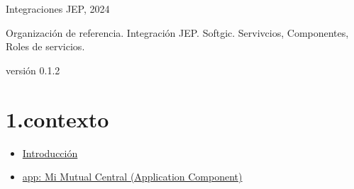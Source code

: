 \documentclass[
  paper=a4,
  ,captions=tableheading
]{scrartcl}
\providecommand{\tightlist}{%
  \setlength{\itemsep}{0pt}\setlength{\parskip}{0pt}}
\begin{document}



Integraciones JEP, 2024

Organización de referencia. Integración JEP. Softgic. Servivcios,
Componentes, Roles de servicios.

versión 0.1.2

\hypertarget{contexto}{%
\section{1.contexto}\label{contexto}}

\begin{itemize}
\tightlist
\item
  \protect\hyperlink{Introducciuxf3n}{Introducción}
\item
  \protect\hyperlink{app:-mi-mutual-central-application-component}{app:
  Mi Mutual Central (Application Component)}


\end{itemize}
\end{document}
